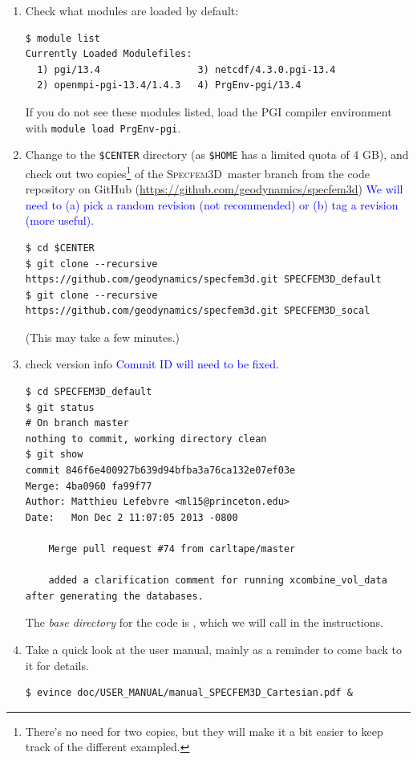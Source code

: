 \documentclass[10pt,fleqn,letterpaper]{article}
\newcommand{\specfem}{\textsc{Specfem3D}}
\newcommand{\blue}[1]{\textcolor{blue}{#1}}
\begin{document}
\begin{enumerate}
\item Check what modules are loaded by default:
%
\begin{lstlisting}
$ module list
Currently Loaded Modulefiles:
  1) pgi/13.4                 3) netcdf/4.3.0.pgi-13.4
  2) openmpi-pgi-13.4/1.4.3   4) PrgEnv-pgi/13.4
\end{lstlisting}

If you do not see these modules listed, load the PGI compiler environment with \lstinline{module load PrgEnv-pgi}.

\item Change to the \verb+$CENTER+ directory (as \verb+$HOME+ has a limited quota of 4 GB), and check out two copies\footnote{There's no need for two copies, but they will make it a bit easier to keep track of the different exampled.} of the \specfem\ master branch from the code repository on GitHub (\url{https://github.com/geodynamics/specfem3d}) \blue{We will need to (a) pick a random revision (not recommended) or (b) tag a revision (more useful).}
%
\begin{lstlisting}
$ cd $CENTER
$ git clone --recursive https://github.com/geodynamics/specfem3d.git SPECFEM3D_default
$ git clone --recursive https://github.com/geodynamics/specfem3d.git SPECFEM3D_socal
\end{lstlisting}
%
(This may take a few minutes.)

\item check version info \blue{Commit ID will need to be fixed.}
%
\begin{lstlisting}
$ cd SPECFEM3D_default
$ git status
# On branch master
nothing to commit, working directory clean
$ git show
commit 846f6e400927b639d94bfba3a76ca132e07ef03e
Merge: 4ba0960 fa99f77
Author: Matthieu Lefebvre <ml15@princeton.edu>
Date:   Mon Dec 2 11:07:05 2013 -0800

    Merge pull request #74 from carltape/master

    added a clarification comment for running xcombine_vol_data after generating the databases.
\end{lstlisting}

The {\em base directory} for the code is , which we will call  in the instructions.

\item Take a quick look at the user manual, mainly as a reminder to come back to it for details. 
%
\begin{lstlisting}
$ evince doc/USER_MANUAL/manual_SPECFEM3D_Cartesian.pdf &
\end{lstlisting}


\end{enumerate}
\end{document}
